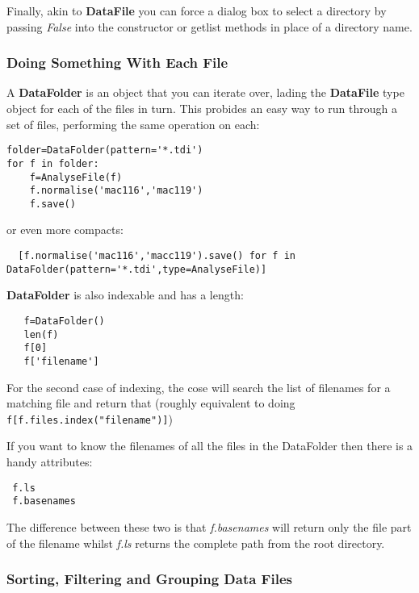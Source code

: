 \documentclass[a4paper,11pt]{scrartcl}
\begin{document}
Finally, akin to \textbf{DataFile} you can force a dialog box to select a directory by passing \textit{False} into the constructor or getlist methods in place of a directory name.

\subsubsection{Doing Something With Each File}

A \textbf{DataFolder} is an object that you can iterate over, lading the \textbf{DataFile} type object for each of the files in turn. This probides an easy way to run through a set of files, performing the same operation on each:

\begin{lstlisting}
folder=DataFolder(pattern='*.tdi')
for f in folder:
	f=AnalyseFile(f)
  	f.normalise('mac116','mac119')
 	f.save()
\end{lstlisting}

or even more compacts:

\begin{lstlisting}
  [f.normalise('mac116','macc119').save() for f in DataFolder(pattern='*.tdi',type=AnalyseFile)]
\end{lstlisting}

\textbf{DataFolder} is also indexable and has a length:

\begin{lstlisting}
   f=DataFolder()
   len(f)
   f[0]
   f['filename']
\end{lstlisting}

For the second case of indexing, the cose will search the list of filenames for a matching file and return that (roughly equivalent to doing \verb#f[f.files.index("filename")]#)

If you want to know the filenames of all the files in the DataFolder then there is a handy attributes:
\begin{lstlisting}
 f.ls
 f.basenames
\end{lstlisting}

The difference between these two is that \textit{f.basenames} will return only the file part of the filename whilst \textit{f.ls} returns the complete path from the root directory.

\subsubsection{Sorting, Filtering and Grouping Data Files}\label{groups}
\end{document}
